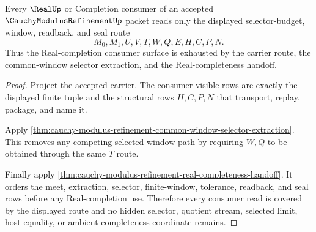 \begin{theorem}
\label{thm:cauchy-modulus-refinement-real-consumer-coverage}
Every $\RealUp$ or Completion consumer of an accepted $\CauchyModulusRefinementUp$ packet reads only the displayed selector-budget, window, readback, and seal route
$$
M_0,M_1,U,V,T,W,Q,E,H,C,P,N.
$$
Thus the Real-completion consumer surface is exhausted by the carrier route, the common-window selector extraction, and the Real-completeness handoff.
\end{theorem}
\begin{proof}
Project the accepted carrier. The consumer-visible rows are exactly the displayed finite tuple and the structural rows $H,C,P,N$ that transport, replay, package, and name it.

Apply \autoref{thm:cauchy-modulus-refinement-common-window-selector-extraction}. This removes any competing selected-window path by requiring $W,Q$ to be obtained through the same $T$ route.

Finally apply \autoref{thm:cauchy-modulus-refinement-real-completeness-handoff}. It orders the meet, extraction, selector, finite-window, tolerance, readback, and seal rows before any Real-completion use. Therefore every consumer read is covered by the displayed route and no hidden selector, quotient stream, selected limit, host equality, or ambient completeness coordinate remains.
\end{proof}

